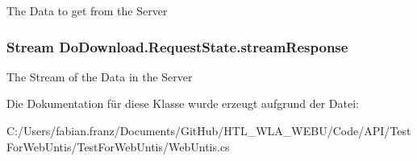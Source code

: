 The Data to get from the Server \hypertarget{class_do_download_1_1_request_state_acd2b043e223ba326627ebdc03eba740b}{
\subsubsection[{stream\-Response}]{\setlength{\rightskip}{0pt plus 5cm}Stream Do\-Download.\-Request\-State.\-stream\-Response}}\label{class_do_download_1_1_request_state_acd2b043e223ba326627ebdc03eba740b}
The Stream of the Data in the Server 

Die Dokumentation für diese Klasse wurde erzeugt aufgrund der Datei\-:\begin{DoxyCompactItemize}
\item 
C\-:/\-Users/fabian.\-franz/\-Documents/\-Git\-Hub/\-H\-T\-L\-\_\-\-W\-L\-A\-\_\-\-W\-E\-B\-U/\-Code/\-A\-P\-I/\-Test\-For\-Web\-Untis/\-Test\-For\-Web\-Untis/Web\-Untis.\-cs\end{DoxyCompactItemize}
